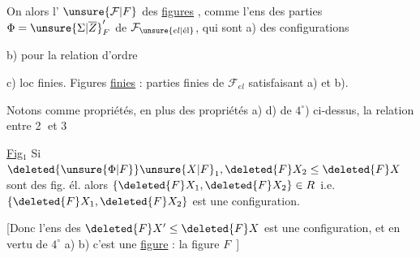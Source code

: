 
On  alors l' $\unsure{\mathcal{F}|F}$ des \uline{figures} , comme l'ens des parties $\Phi={\unsure{\Sigma|\overline{Z}}}'_{F}$ de $\mathcal{F}_{\unsure{el|\text{él}}}$, qui sont a) des configurations

b)  pour la relation d'ordre

c) loc finies. Figures \uline{finies} : parties finies de $\mathcal{F}_{el}$ satisfaisant a) et b).


Notons comme propriétés, en plus des propriétés a)  d) de $4^\circ$) ci-dessus, la relation entre \textcircled{2} et \textcircled{3}


\uline{Fig}$_1$ Si $\deleted{\unsure{\Phi|F}}\unsure{X|F}_1,\deleted{F}X_2\leq\deleted{F}X$ sont des fig. él. alors $\{\deleted{F}X_1,\deleted{F}X_2\}\in R$ i.e. $\{\deleted{F}X_1,\deleted{F}X_2\}$ est une configuration.

[Donc l'ens des $\deleted{F}X'\leq\deleted{F}X$ est une configuration, et en vertu de $4^\circ$ a) b) c'est  une \uline{figure} : la figure   $F$\unsure{\ldots|\,--}\ ]

